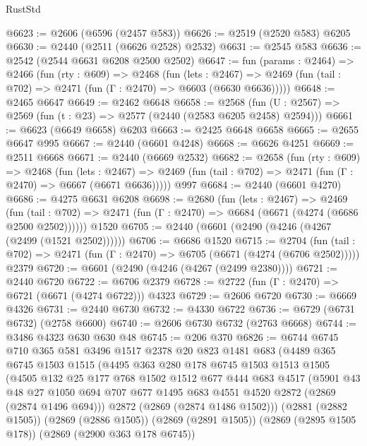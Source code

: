 \begin{lexlean}{RustStd}
\begin{coremodule}
{\begin{coremodule}
{{{{{{{{{{{{@6623 := @2606 (@6596 (@2457 @583))
@6626 := @2519 (@2520 @583) @6205
@6630 := @2440 (@2511 (@6626 @2528) @2532)
@6631 := @2545 @583
@6636 := @2542 (@2544 @6631 @6208 @2500 @2502)
@6647 := fun (params : @2464) =>
  @2466
    (fun (rty : @609) =>
    @2468
      (fun (lets : @2467) =>
      @2469 (fun (tail : @702) => @2471 (fun (Γ : @2470) => @6603 (@6630 @6636)))))
@6648 := @2465 @6647
@6649 := @2462 @6648
@6658 := @2568 (fun (U : @2567) => @2569 (fun (t : @23) => @2577 (@2440 (@2583 @6205 @2458) @2594)))
@6661 := @6623 (@6649 @6658) @6203
@6663 := @2425 @6648 @6658
@6665 := @2655 @6647 @995
@6667 := @2440 (@6601 @4248)
@6668 := @6626 @4251
@6669 := @2511 @6668
@6671 := @2440 (@6669 @2532)
@6682 := @2658
    (fun (rty : @609) =>
    @2468
      (fun (lets : @2467) =>
      @2469 (fun (tail : @702) => @2471 (fun (Γ : @2470) => @6667 (@6671 @6636)))))
    @997
@6684 := @2440 (@6601 @4270)
@6686 := @4275 @6631 @6208
@6698 := @2680
    (fun (lets : @2467) =>
    @2469
      (fun (tail : @702) => @2471 (fun (Γ : @2470) => @6684 (@6671 (@4274 (@6686 @2500 @2502))))))
    @1520
@6705 := @2440 (@6601 (@2490 (@4246 (@4267 (@2499 (@1521 @2502))))))
@6706 := @6686 @1520
@6715 := @2704
    (fun (tail : @702) => @2471 (fun (Γ : @2470) => @6705 (@6671 (@4274 (@6706 @2502)))))
    @2379
@6720 := @6601 (@2490 (@4246 (@4267 (@2499 @2380))))
@6721 := @2440 @6720
@6722 := @6706 @2379
@6728 := @2722 (fun (Γ : @2470) => @6721 (@6671 (@4274 @6722))) @4323
@6729 := @2606 @6720
@6730 := @6669 @4326
@6731 := @2440 @6730
@6732 := @4330 @6722
@6736 := @6729 (@6731 @6732) (@2758 @6600)
@6740 := @2606 @6730 @6732 (@2763 @6668)
@6744 := @3486 @4323 @630 @630 @48
@6745 := @206 @370
@6826 := @6744
    @6745
    @710
    @365
    @581
    @3496
    @1517
    @2378
    @20
    @823
    @1481
    @683
    (@4489
      @365
      @6745
      @1503
      @1515
      (@4495
        @363
        @280
        @178
        @6745
        @1503
        @1513
        @1505
        (@4505
          @132
          @25
          @177
          @768
          @1502
          @1512
          @677
          @444
          @683
          @4517
          (@5901
            @43
            @48
            @27
            @1050
            @694
            @707
            @677
            @1495
            @683
            @4551
            @4520
            @2872
            (@2869 (@2874 @1496 @694)))
          @2872
          (@2869 (@2874 @1486 @1502)))
        (@2881 (@2882 @1505))
        (@2869 (@2886 @1505))
        (@2869 (@2891 @1505))
        (@2869 (@2895 @1505 @178))
        (@2869 (@2900 @363 @178 @6745))
}}}}}}}}}}}}
\end{coremodule}}
\end{coremodule}
\end{lexlean}
